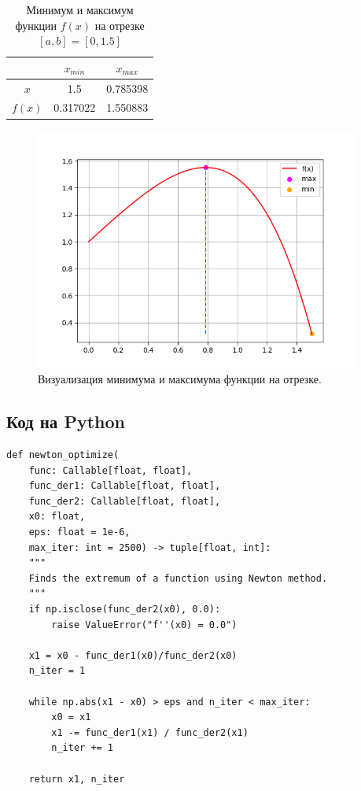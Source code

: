 \documentclass[12pt]{article}%
\begin{document}
\begin{table}[!h]
    \centering
    \begin{tabular}{|c|c|c|}
\hline & $x_{min}$ & $x_{max}$  \\
\hline $x$ & 1.5 & 0.785398 \\
\hline $f(x)$ & 0.317022 & 1.550883 \\
\hline
    \end{tabular}
    \caption{Минимум и максимум функции $f(x)$ на отрезке $[a, b]=[0, 1.5]$}
    \label{tab:my_label}
\end{table}

\newpage
\begin{figure}[!h]
    \centering
    \includegraphics[width=0.95\textwidth]{task1_opt.png}
    \caption{Визуализация минимума и максимума функции на отрезке.}
\end{figure}



\subsection{Код на Python}
\begin{verbatim}
def newton_optimize(
    func: Callable[float, float],
    func_der1: Callable[float, float],
    func_der2: Callable[float, float],
    x0: float,
    eps: float = 1e-6, 
    max_iter: int = 2500) -> tuple[float, int]:
    """
    Finds the extremum of a function using Newton method.
    """
    if np.isclose(func_der2(x0), 0.0):
        raise ValueError("f''(x0) = 0.0")

    x1 = x0 - func_der1(x0)/func_der2(x0)
    n_iter = 1

    while np.abs(x1 - x0) > eps and n_iter < max_iter:
        x0 = x1
        x1 -= func_der1(x1) / func_der2(x1)
        n_iter += 1

    return x1, n_iter
\end{verbatim}
\end{document}
